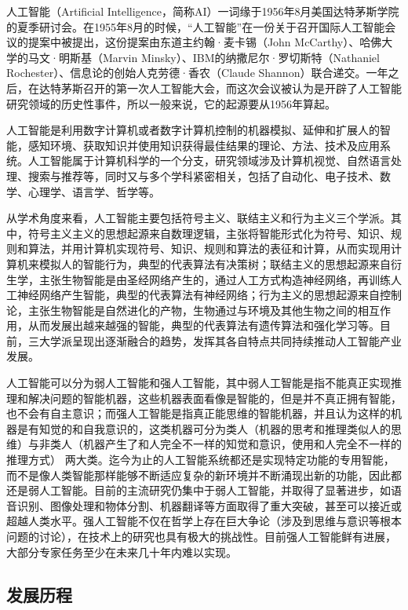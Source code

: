 人工智能（Artificial Intelligence，简称AI）一词缘于1956年8月美国达特茅斯学院的夏季研讨会。在1955年8月的时候，“人工智能”在一份关于召开国际人工智能会议的提案中被提出，这份提案由东道主约翰·麦卡锡（John McCarthy）、哈佛大学的马文·明斯基（Marvin Minsky）、IBM的纳撒尼尔·罗切斯特（Nathaniel Rochester）、信息论的创始人克劳德·香农（Claude Shannon）联合递交。一年之后，在达特茅斯召开的第一次人工智能大会，而这次会议被认为是开辟了人工智能研究领域的历史性事件，所以一般来说，它的起源要从1956年算起。

人工智能是利用数字计算机或者数字计算机控制的机器模拟、延伸和扩展人的智能，感知环境、获取知识并使用知识获得最佳结果的理论、方法、技术及应用系统。人工智能属于计算机科学的一个分支，研究领域涉及计算机视觉、自然语言处理、搜索与推荐等，同时又与多个学科紧密相关，包括了自动化、电子技术、数学、心理学、语言学、哲学等。

从学术角度来看，人工智能主要包括符号主义、联结主义和行为主义三个学派。其中，符号主义主义的思想起源来自数理逻辑，主张将智能形式化为符号、知识、规则和算法，并用计算机实现符号、知识、规则和算法的表征和计算，从而实现用计算机来模拟人的智能行为，典型的代表算法有决策树；联结主义的思想起源来自衍生学，主张生物智能是由圣经网络产生的，通过人工方式构造神经网络，再训练人工神经网络产生智能，典型的代表算法有神经网络；行为主义的思想起源来自控制论，主张生物智能是自然进化的产物，生物通过与环境及其他生物之间的相互作用，从而发展出越来越强的智能，典型的代表算法有遗传算法和强化学习等。目前，三大学派呈现出逐渐融合的趋势，发挥其各自特点共同持续推动人工智能产业发展。

人工智能可以分为弱人工智能和强人工智能，其中弱人工智能是指不能真正实现推理和解决问题的智能机器，这些机器表面看像是智能的，但是并不真正拥有智能，也不会有自主意识；而强人工智能是指真正能思维的智能机器，并且认为这样的机器是有知觉的和自我意识的，这类机器可分为类人（机器的思考和推理类似人的思维）与非类人（机器产生了和人完全不一样的知觉和意识，使用和人完全不一样的推理方式） 两大类。迄今为止的人工智能系统都还是实现特定功能的专用智能，而不是像人类智能那样能够不断适应复杂的新环境并不断涌现出新的功能，因此都还是弱人工智能。目前的主流研究仍集中于弱人工智能，并取得了显著进步，如语音识别、图像处理和物体分割、机器翻译等方面取得了重大突破，甚至可以接近或超越人类水平。强人工智能不仅在哲学上存在巨大争论（涉及到思维与意识等根本问题的讨论），在技术上的研究也具有极大的挑战性。目前强人工智能鲜有进展，大部分专家任务至少在未来几十年内难以实现。

\subsection[发展历程]{发展历程}

